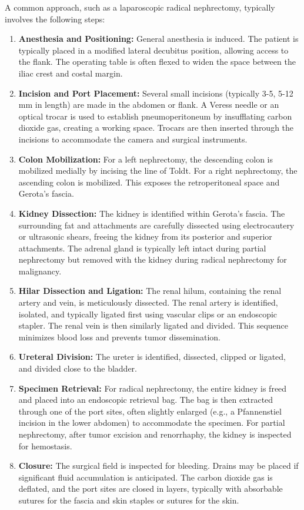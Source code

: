 A common approach, such as a laparoscopic radical nephrectomy, typically involves the following steps:
\begin{enumerate}
  \item \textbf{Anesthesia and Positioning:} General anesthesia is induced. The patient is typically placed in a modified lateral decubitus position, allowing access to the flank. The operating table is often flexed to widen the space between the iliac crest and costal margin.
  \item \textbf{Incision and Port Placement:} Several small incisions (typically 3-5, 5-12 mm in length) are made in the abdomen or flank. A Veress needle or an optical trocar is used to establish pneumoperitoneum by insufflating carbon dioxide gas, creating a working space. Trocars are then inserted through the incisions to accommodate the camera and surgical instruments.
  \item \textbf{Colon Mobilization:} For a left nephrectomy, the descending colon is mobilized medially by incising the line of Toldt. For a right nephrectomy, the ascending colon is mobilized. This exposes the retroperitoneal space and Gerota's fascia.
  \item \textbf{Kidney Dissection:} The kidney is identified within Gerota's fascia. The surrounding fat and attachments are carefully dissected using electrocautery or ultrasonic shears, freeing the kidney from its posterior and superior attachments. The adrenal gland is typically left intact during partial nephrectomy but removed with the kidney during radical nephrectomy for malignancy.
  \item \textbf{Hilar Dissection and Ligation:} The renal hilum, containing the renal artery and vein, is meticulously dissected. The renal artery is identified, isolated, and typically ligated first using vascular clips or an endoscopic stapler. The renal vein is then similarly ligated and divided. This sequence minimizes blood loss and prevents tumor dissemination.
  \item \textbf{Ureteral Division:} The ureter is identified, dissected, clipped or ligated, and divided close to the bladder.
  \item \textbf{Specimen Retrieval:} For radical nephrectomy, the entire kidney is freed and placed into an endoscopic retrieval bag. The bag is then extracted through one of the port sites, often slightly enlarged (e.g., a Pfannenstiel incision in the lower abdomen) to accommodate the specimen. For partial nephrectomy, after tumor excision and renorrhaphy, the kidney is inspected for hemostasis.
  \item \textbf{Closure:} The surgical field is inspected for bleeding. Drains may be placed if significant fluid accumulation is anticipated. The carbon dioxide gas is deflated, and the port sites are closed in layers, typically with absorbable sutures for the fascia and skin staples or sutures for the skin.
\end{enumerate}

